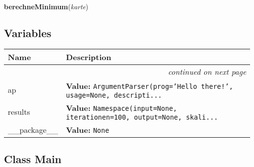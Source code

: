     \vspace{0.5ex}

\hspace{.8\funcindent}\begin{boxedminipage}{\funcwidth}

    \raggedright \textbf{berechneMinimum}(\textit{karte})

\setlength{\parskip}{2ex}
\setlength{\parskip}{1ex}
    \end{boxedminipage}



  \subsection{Variables}

    \vspace{-1cm}
\hspace{\varindent}\begin{longtable}{|p{\varnamewidth}|p{\vardescrwidth}|l}
\cline{1-2}
\cline{1-2} \centering \textbf{Name} & \centering \textbf{Description}& \\
\cline{1-2}
\endhead\cline{1-2}\multicolumn{3}{r}{\small\textit{continued on next page}}\\\endfoot\cline{1-2}
\endlastfoot\raggedright a\-p\- & \raggedright \textbf{Value:} 
{\tt ArgumentParser(prog='Hello there!', usage=None, descripti\texttt{...}}&\\
\cline{1-2}
\raggedright r\-e\-s\-u\-l\-t\-s\- & \raggedright \textbf{Value:} 
{\tt Namespace(input=None, iterationen=100, output=None, skali\texttt{...}}&\\
\cline{1-2}
\raggedright \_\-\_\-p\-a\-c\-k\-a\-g\-e\-\_\-\_\- & \raggedright \textbf{Value:} 
{\tt None}&\\
\cline{1-2}
\end{longtable}



\subsection{Class Main}

